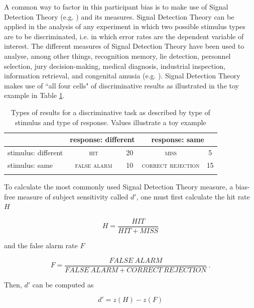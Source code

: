 A common way to factor in this participant bias is to make use of Signal Detection Theory (e.g. \cite{Macmillan1993,Macmillan2005}) and its measures. Signal Detection Theory can be applied in the analysis of any experiment in which two possible stimulus types are to be discriminated, i.e. in which error rates are the dependent variable of interest. The different measures of Signal Detection Theory have been used to analyse, among other things, recognition memory, lie detection, personnel selection, jury decision-making, medical diagnosis, industrial inspection, information retrieval, and congenital amusia (e.g. \cite{Stanislaw1999, Pfeifer2018}). Signal Detection Theory makes use of ``all four cells" of discriminative results as illustrated in the toy example in Table \ref{tab:6.9}.

\begin{table}\fontsize{10}{11}
\caption{Types of results for a discriminative task as described by type of stimulus and type of response. Values illustrate a toy example}
\label{tab:6.9}
\centering
\begin{tabular}{lcccc}
\lsptoprule
\textbf{~}          & \multicolumn{2}{c}{response: different} & \multicolumn{2}{c}{response: same}  \\
\midrule
stimulus: different & \textsc{hit}         & 20                        & \textsc{miss}              & 5               \\
stimulus: same      & \textsc{false alarm} & 10                        & \textsc{correct rejection} & 15              \\
\lspbottomrule
\end{tabular}
\end{table}

To calculate the most commonly used Signal Detection Theory measure, a bias-free measure of subject sensitivity called $d'$, one must first calculate the hit rate $H$

\begin{equation}
\label{eq:H}
    H=\frac{HIT}{HIT+MISS}
\end{equation}

and the false alarm rate $F$

\begin{equation}
\label{eq:F}
    F=\frac{FALSE\ ALARM}{FALSE\ ALARM + CORRECT\ REJECTION}\ .
\end{equation}

Then, $d'$ can be computed as

\begin{equation}
\label{eq:dprime}
    d'=z(H)-z(F)
\end{equation}

